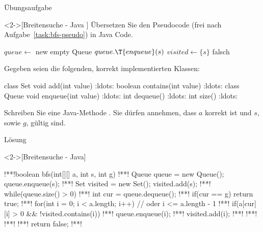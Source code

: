 \begin{frame}[fragile,c]{Übungsaufgabe}
    \begin{exercise}<2->[Breitensuche - Java ]
        \pause{}Übersetzen Sie den Pseudocode (frei nach Aufgabe~\ref{task:bfs-pseudo}) in Java Code.
\par\pause
{}%
%
%
%
%
\begin{minipage}{.5\linewidth}\scriptsize{}\SetAlgoVlined%
\begin{algorithm}[H]
\PreCode\StartCode
\(queue \leftarrow\) new empty Queue\;
\(queue.\T{enqueue}(s)\)\;
\(visited \leftarrow \{s\}\)\;
\KwRet falsch\;
\end{algorithm}\end{minipage}\hfill\begin{minipage}{.465\linewidth}%
    \pause{}Gegeben seien die folgenden, korrekt implementierten Klassen:\pause
\begin{plainjava}
class Set {
  void add(int value) {:ldots:}
  boolean contains(int value) {:ldots:}
}
class Queue {
  void enqueue(int value) {:ldots:}
  int dequeue() {:ldots:}
  int size() {:ldots:}
}
\end{plainjava}
\end{minipage}\par
Schreiben Sie eine Java-Methode . Sie dürfen annehmen, dass \(a\) korrekt ist und \(s\), sowie \(g\), gültig sind.
    \end{exercise}
\end{frame}

\begin{frame}[fragile,c]{Lösung}
    \begin{solve}<2->[Breitensuche - Java]
\begin{plainjava}[morekeywords={[4]{enqueue,dequeue,contains,add,size}}]
!**!boolean bfs(int[][] a, int s, int g) {
!**!    Queue queue = new Queue(); queue.enqueue(s);
!**!    Set visited = new Set();   visited.add(s);
!**!    while(queue.size() > 0) {
!**!        int cur = queue.dequeue();
!**!        if(cur == g) return true;
!**!        for(int i = 0; i < a.length; i++) { // oder i <= a.length - 1
!**!            if(a[cur][i] > 0 && !visited.contains(i)) {
!**!                queue.enqueue(i);
!**!                visited.add(i);
!**!            }
!**!        }
!**!    }
!**!    return false;
!**!}
\end{plainjava}
    \end{solve}
\end{frame}
\fi
